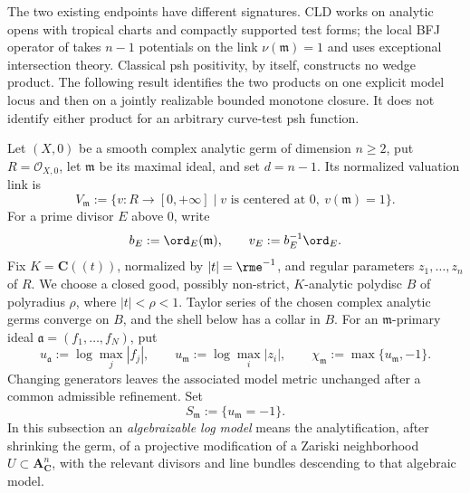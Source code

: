 The two existing endpoints have different signatures.  CLD works on analytic
opens with tropical charts and compactly supported test forms; the local BFJ
operator of  takes \(n-1\) potentials on the link
\(\nu(\mathfrak m)=1\) and uses exceptional intersection theory.  Classical
psh positivity, by itself, constructs no wedge product.  The following
result identifies the two products on one explicit model locus and then on a
jointly realizable bounded monotone closure.  It does not identify either
product for an arbitrary curve-test psh function.

Let \((X,0)\) be a smooth complex analytic germ of dimension \(n\geq2\), put
\(R=\mathcal O_{X,0}\), let \(\mathfrak m\) be its maximal ideal, and set
\(d=n-1\).  Its normalized valuation link is
\begin{equation}
 V_{\mathfrak m}
 :=\{v:R\longrightarrow[0,+\infty]\mid
       v\text{ is centered at }0,\ v(\mathfrak m)=1\}.
 \label{eq:frontier-local-ma-link}
\end{equation}
For a prime divisor \(E\) above \(0\), write
\begin{equation}
 b_E:=\ord_E(\mathfrak m),
 \qquad v_E:=b_E^{-1}\ord_E.
 \label{eq:frontier-local-ma-divisorial-normalization}
\end{equation}
Fix \(K=\mathbf C((t))\), normalized by \(|t|=\rme^{-1}\), and regular
parameters \(z_1,\ldots,z_n\) of \(R\).  We choose a closed good, possibly
non-strict, \(K\)-analytic polydisc \(B\) of polyradius \(\rho\), where
\(|t|<\rho<1\).  Taylor series of the chosen complex analytic germs converge
on \(B\), and the shell below has a collar in \(B\).  For an
\(\mathfrak m\)-primary ideal
\(\mathfrak a=(f_1,\ldots,f_N)\), put
\begin{equation}
 u_{\mathfrak a}:=\log\max_j|f_j|,
 \qquad
 u_{\mathfrak m}:=\log\max_i|z_i|,
 \qquad
 \chi_{\mathfrak m}:=\max\{u_{\mathfrak m},-1\}.
 \label{eq:frontier-local-ma-model-functions}
\end{equation}
Changing generators leaves the associated model metric unchanged after a
common admissible refinement.  Set
\begin{equation}
S_{\mathfrak m}:=\{u_{\mathfrak m}=-1\}.
\label{eq:frontier-local-ma-shell}
\end{equation}
In this subsection an \emph{algebraizable log model} means the
analytification, after shrinking the germ, of a projective modification of a
Zariski neighborhood \(U\subset\mathbf A^n_{\mathbf C}\), with the relevant
divisors and line bundles descending to that algebraic model.

